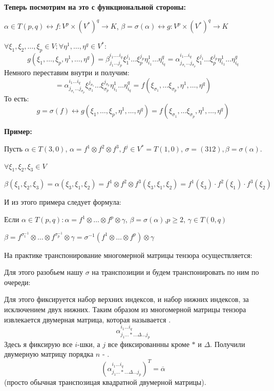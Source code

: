 \textbf{Теперь посмотрим на это с функциональной стороны:}

$\alpha \in T(p,q) \leftrightarrow f: V^p \times (V^*)^q \rightarrow K$, $\beta = \sigma(\alpha) \leftrightarrow g: V^p\times (V^*)^q\rightarrow K$

$\forall \xi_1,\xi_2,\ldots, \xi_p \in V;\forall \eta^1,\ldots,\eta^q \in V^*:$
$$g(\xi_1, \ldots, \xi_p, \eta^1,\ldots, \eta^q) = \beta_{j_1\ldots j_p}^{i_1.\ldots i_q} \xi_1^{j_1}\ldots \xi_{p}^{j_p}\eta_{i_1}^1 \ldots \eta_{i_q}^q = \alpha_{j_{\sigma_1}\ldots j_{\sigma_p}}^{i_1\ldots i_q} \xi_1^{j_1}\ldots \xi^{j_p}_p \eta_{i_1}^1 \ldots \eta_{i_q}^q $$
Немного переставим внутри и получим:
$$=\alpha_{j_{\sigma_1}\ldots j_{\sigma_p}}^{i_1\ldots i_q} \xi_{\sigma_1}^{j_{\sigma_1}}\ldots \xi^{j_{\sigma_p}}_{\sigma_p} \eta_{i_1}^1 \ldots \eta_{i_q}^q = f(\xi_{\sigma_1},\ldots \xi_{\sigma_p}, \eta^1,\ldots, \eta^q)$$
То есть:
$$g = \sigma(f) \leftrightarrow g(\xi_1,\ldots, \xi_p, \eta^1, \ldots, \eta^q) = f(\xi_{\sigma_1},\ldots \xi_{\sigma_p}, \eta^1,\ldots, \eta^q)$$

\textbf{Пример:}

Пусть $\alpha \in T(3,0)$, $\alpha = f^1 \otimes f^2 \otimes f^3, f^j \in V^* = T(1,0)$, $\sigma = (312), \beta = \sigma(\alpha)$.

$\forall \xi_1,\xi_2,\xi_3 \in V$

$\beta(\xi_1,\xi_2,\xi_3) = \alpha(\xi_3,\xi_1,\xi_2) = f^1\otimes f^2 \otimes f^3 (\xi_3,\xi_1,\xi_2) = f^1(\xi_3)\cdot f^2(\xi_1)\cdot f^3(\xi_2)$

И из этого примера следует формула:

Если $\alpha \in T(p,q): \alpha = f^1 \otimes \ldots \otimes f^p \otimes \gamma $, $\beta = \sigma(\alpha)$,$p\geq 2$, $\gamma \in T(0,q)$

$\beta = f^{\sigma_1^{-1}}\otimes \ldots \otimes f^{\sigma_p^{-1}} \otimes \gamma = \sigma^{-1}(f^1\otimes \ldots \otimes f^p) \otimes \gamma$

На практике транспонирование многомерной матрицы тензора осуществляется:


Для этого разобьем нашу $\sigma$ на транспозиции и будем транспонировать по ним по очереди:

Для этого фиксируется набор верхних индексов,  и набор нижних индексов, за исключением двух нижних. Таким образом из многомерной матрицы тензора извлекается двумерная матрица, которая называется .
$$\alpha^{i_1\ldots i_q}_{j_1 \ldots * \ldots \Delta \ldots j_p}$$
Здесь я фиксирую все $i$-шки, а $j$ все фиксированнны кроме $*$  и $\Delta$. Получили двумерную матрицу порядка $n$ - .
$$(\alpha_{j_1\ldots * \ldots \Delta \ldots j_p}^{i_1 \ldots i_q})^T = \overline{\alpha}$$
(просто обычная транспозицая квадратной двумерной матрицы).

